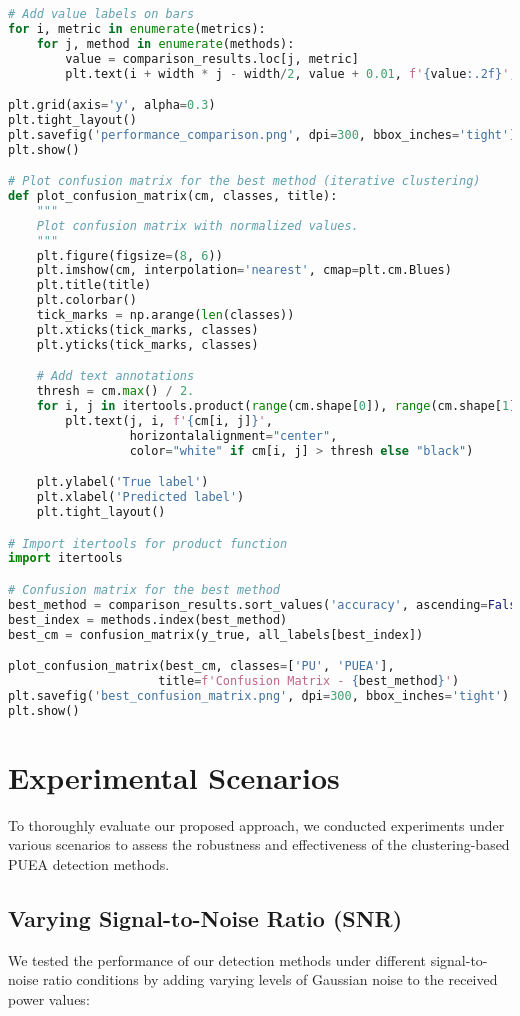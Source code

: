 \begin{lstlisting}[language=Python, caption=Performance Evaluation Implementation]
# Add value labels on bars
for i, metric in enumerate(metrics):
    for j, method in enumerate(methods):
        value = comparison_results.loc[j, metric]
        plt.text(i + width * j - width/2, value + 0.01, f'{value:.2f}', ha='center', va='bottom', fontsize=8)

plt.grid(axis='y', alpha=0.3)
plt.tight_layout()
plt.savefig('performance_comparison.png', dpi=300, bbox_inches='tight')
plt.show()

# Plot confusion matrix for the best method (iterative clustering)
def plot_confusion_matrix(cm, classes, title):
    """
    Plot confusion matrix with normalized values.
    """
    plt.figure(figsize=(8, 6))
    plt.imshow(cm, interpolation='nearest', cmap=plt.cm.Blues)
    plt.title(title)
    plt.colorbar()
    tick_marks = np.arange(len(classes))
    plt.xticks(tick_marks, classes)
    plt.yticks(tick_marks, classes)

    # Add text annotations
    thresh = cm.max() / 2.
    for i, j in itertools.product(range(cm.shape[0]), range(cm.shape[1])):
        plt.text(j, i, f'{cm[i, j]}',
                 horizontalalignment="center",
                 color="white" if cm[i, j] > thresh else "black")

    plt.ylabel('True label')
    plt.xlabel('Predicted label')
    plt.tight_layout()

# Import itertools for product function
import itertools

# Confusion matrix for the best method
best_method = comparison_results.sort_values('accuracy', ascending=False).iloc[0]['method']
best_index = methods.index(best_method)
best_cm = confusion_matrix(y_true, all_labels[best_index])

plot_confusion_matrix(best_cm, classes=['PU', 'PUEA'], 
                     title=f'Confusion Matrix - {best_method}')
plt.savefig('best_confusion_matrix.png', dpi=300, bbox_inches='tight')
plt.show()
\end{lstlisting}

\section{Experimental Scenarios}
To thoroughly evaluate our proposed approach, we conducted experiments under various scenarios to assess the robustness and effectiveness of the clustering-based PUEA detection methods.

\subsection{Varying Signal-to-Noise Ratio (SNR)}
We tested the performance of our detection methods under different signal-to-noise ratio conditions by adding varying levels of Gaussian noise to the received power values:

